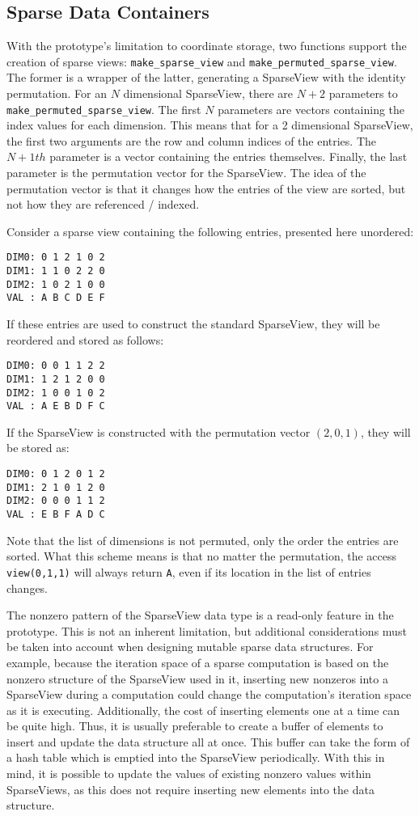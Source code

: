 \subsection{Sparse Data Containers}

With the prototype's limitation to coordinate storage, two functions support the creation of sparse views: \verb.make_sparse_view. and \verb.make_permuted_sparse_view..
The former is a wrapper of the latter, generating a SparseView with the identity permutation.
For an $N$ dimensional SparseView, there are $N+2$ parameters to \verb.make_permuted_sparse_view..
The first $N$ parameters are vectors containing the index values for each dimension. 
This means that for a 2 dimensional SparseView, the first two arguments are the row and column indices of the entries.
The $N+1th$ parameter is a vector containing the entries themselves. 
Finally, the last parameter is the permutation vector for the SparseView. 
The idea of the permutation vector is that it changes how the entries of the view are sorted, but not how they are referenced / indexed.

Consider a sparse view containing the following entries, presented here unordered:
\begin{lstlisting}
DIM0: 0 1 2 1 0 2
DIM1: 1 1 0 2 2 0
DIM2: 1 0 2 1 0 0
VAL : A B C D E F 
\end{lstlisting}
If these entries are used to construct the standard SparseView, they will be reordered and stored as follows:
\begin{lstlisting}
DIM0: 0 0 1 1 2 2
DIM1: 1 2 1 2 0 0
DIM2: 1 0 0 1 0 2
VAL : A E B D F C
\end{lstlisting}
If the SparseView is constructed with the permutation vector $(2,0,1)$, they will be stored as:
\begin{lstlisting}
DIM0: 0 1 2 0 1 2
DIM1: 2 1 0 1 2 0
DIM2: 0 0 0 1 1 2
VAL : E B F A D C
\end{lstlisting}
Note that the list of dimensions is not permuted, only the order the entries are sorted. 
What this scheme means is that no matter the permutation, the access \verb.view(0,1,1). will always return \verb.A., even if its location in the list of entries changes.

The nonzero pattern of the SparseView data type is a read-only feature in the prototype.
This is not an inherent limitation, but additional considerations must be taken into account when designing mutable sparse data structures.
For example, because the iteration space of a sparse computation is based on the nonzero structure of the SparseView used in it, inserting new nonzeros into a SparseView during a computation could change the computation's iteration space as it is executing.
Additionally, the cost of inserting elements one at a time can be quite high. 
Thus, it is usually preferable to create a buffer of elements to insert and update the data structure all at once.
This buffer can take the form of a hash table which is emptied into the SparseView periodically.
With this in mind, it is possible to update the values of existing nonzero values within SparseViews, as this does not require inserting new elements into the data structure.

